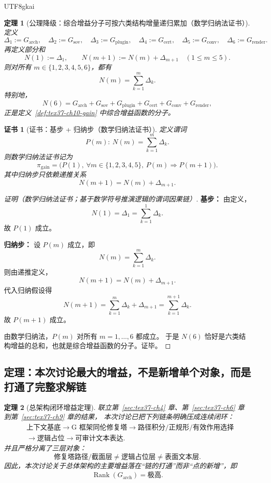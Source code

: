 \documentclass[12pt]{article}
\newtheorem{theorem}{定理}[section]
\newtheorem{Certificate}{证书}[section]
\begin{document}
\begin{CJK*}{UTF8}{gkai}
\begin{theorem}[公理降级：综合增益分子可按六类结构增量递归累加（数学归纳法证书）]
\label{thm:tex37-ch10-decompose}
定义
\[
  \Delta_1:=G_{\mathrm{arch}},
  \quad
  \Delta_2:=G_{\mathrm{sov}},
  \quad
  \Delta_3:=G_{\mathrm{plugin}},
  \quad
  \Delta_4:=G_{\mathrm{cert}},
  \quad
  \Delta_5:=G_{\mathrm{conv}},
  \quad
  \Delta_6:=G_{\mathrm{render}}.
\]
再定义部分和
\[
  N(1):=\Delta_1,
  \qquad
  N(m+1):=N(m)+\Delta_{m+1}
  \quad (1\le m\le 5).
\]
则对所有 $m\in\{1,2,3,4,5,6\}$，都有
\[
  N(m)=\sum_{k=1}^{m}\Delta_k.
\]
特别地，
\[
  N(6)
  =
  G_{\mathrm{arch}}
  +
  G_{\mathrm{sov}}
  +
  G_{\mathrm{plugin}}
  +
  G_{\mathrm{cert}}
  +
  G_{\mathrm{conv}}
  +
  G_{\mathrm{render}},
\]
正是定义~\ref{def:tex37-ch10-gain} 中综合增益函数的分子。
\end{theorem}

\begin{Certificate}[证书：基步 + 归纳步（数学归纳法证书）]
\label{cert:tex37-ch10-decompose}
定义谓词
\[
  P(m):\ N(m)=\sum_{k=1}^{m}\Delta_k.
\]
则数学归纳法证书记为
\[
  \pi_{\mathrm{gain}}
  =
  \bigl(
    P(1),\
    \forall m\in\{1,2,3,4,5\},\ P(m)\Rightarrow P(m+1)
  \bigr).
\]
其中归纳步只依赖递推关系
\[
  N(m+1)=N(m)+\Delta_{m+1}.
\]
\end{Certificate}

\begin{proof}[证明（数学归纳法证书；基于数学符号推演逻辑的谓词因果链）]
\textbf{基步：}
由定义，
\[
  N(1)=\Delta_1=\sum_{k=1}^{1}\Delta_k.
\]
故 $P(1)$ 成立。

\textbf{归纳步：}
设 $P(m)$ 成立，即
\[
  N(m)=\sum_{k=1}^{m}\Delta_k.
\]
则由递推定义，
\[
  N(m+1)=N(m)+\Delta_{m+1}.
\]
代入归纳假设得
\[
  N(m+1)
  =
  \sum_{k=1}^{m}\Delta_k+\Delta_{m+1}
  =
  \sum_{k=1}^{m+1}\Delta_k.
\]
故 $P(m+1)$ 成立。

由数学归纳法，$P(m)$ 对所有 $m=1,\dots,6$ 都成立。
于是 $N(6)$ 恰好是六类结构增益的总和，也就是综合增益函数的分子。证毕。
\end{proof}

\subsection{定理：本次讨论最大的增益，不是新增单个对象，而是打通了完整求解链}
\label{subsec:tex37-ch10-theorem-arch}

\begin{theorem}[总架构闭环增益定理]
\label{thm:tex37-ch10-arch}
联立第~\ref{sec:tex37-ch4} 章、第~\ref{sec:tex37-ch6} 章到第~\ref{sec:tex37-ch9} 章的结果，
本次讨论已把下列链条明确压成连续闭环：
\[
  \begin{aligned}
    &\text{上下文基底}
    \to
    \text{G 框架同伦修复塔}
    \to
    \text{路径积分/正规形/有效作用选择}\\
    &\to
    \text{逻辑占位}
    \to
    \text{可审计文本表达}.
  \end{aligned}
\]
并且严格分离了三层对象：
\[
  \text{修复塔路径/截面层}
  \neq
  \text{逻辑占位层}
  \neq
  \text{表面文本层}.
\]
因此，本次讨论关于总体架构的主要增益落在“链的打通”而非“点的新增”，即
\[
  \operatorname{Rank}(G_{\mathrm{arch}})=\text{极高}.
\]
\end{theorem}


\end{CJK*}
\end{document}
